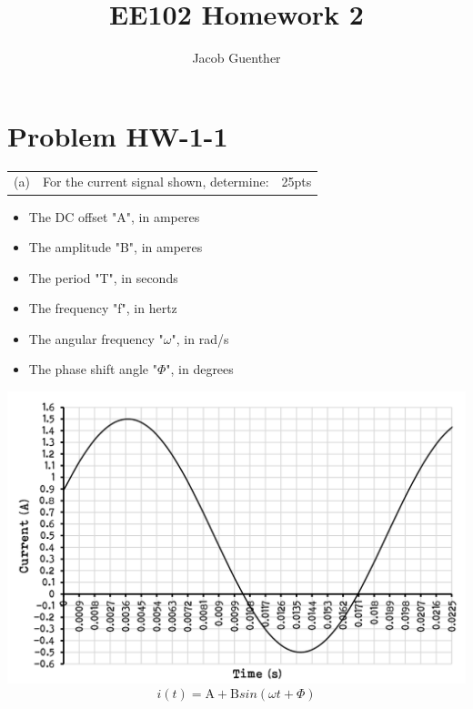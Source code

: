 \documentclass{article}
\title{EE102 Homework 2}
\author{Jacob Guenther}
\newcommand{\problemstatement}[3]{
\noindent
\begin{tabular}{ m{0.5cm} m{42em} m{0.5cm} }
	({#1}) & {#2} & {#3}pts
\end{tabular}
}
\begin{document}


\section{Problem HW-1-1}
\problemstatement{a}{For the current signal shown, determine:}{25}
\begin{itemize}
	\item The DC offset "A", in amperes
	\item The amplitude "B", in amperes
	\item The period "T", in seconds
	\item The frequency "f", in hertz
	\item The angular frequency "$\omega$", in rad/s
	\item The phase shift angle "$\Phi$", in degrees
\end{itemize}
\includegraphics[width=\textwidth]{figure_hw2_1}
\begin{equation}
	i(t)= \text{A} + \text{B} sin( \omega t + \Phi )
\end{equation}
\end{document}
